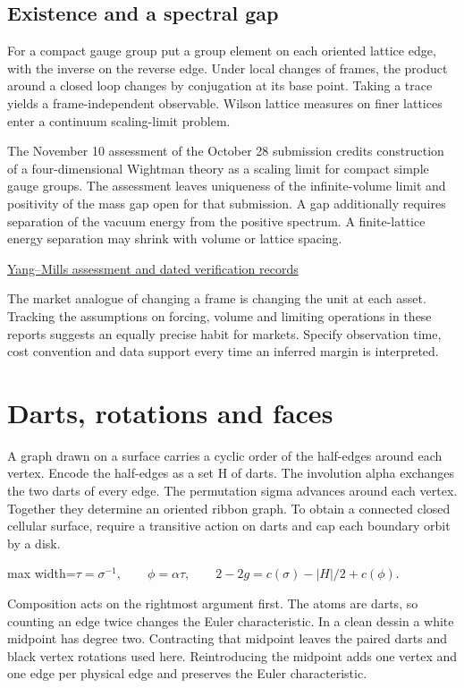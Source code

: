 \documentclass[11pt,oneside,openany]{book}
\begin{document}
\section*{Existence and a spectral gap}
For a compact gauge group put a group element on each oriented lattice edge, with the inverse on the reverse edge. Under local changes of frames, the product around a closed loop changes by conjugation at its base point. Taking a trace yields a frame-independent observable. Wilson lattice measures on finer lattices enter a continuum scaling-limit problem.

The November 10 assessment of the October 28 submission credits construction of a four-dimensional Wightman theory as a scaling limit for compact simple gauge groups. The assessment leaves uniqueness of the infinite-volume limit and positivity of the mass gap open for that submission. A gap additionally requires separation of the vacuum energy from the positive spectrum. A finite-lattice energy separation may shrink with volume or lattice spacing.

{\small\sffamily\href{https://github.com/yang-mills-group/YM}{Yang–Mills assessment and dated verification records}\par}
The market analogue of changing a frame is changing the unit at each asset. Tracking the assumptions on forcing, volume and limiting operations in these reports suggests an equally precise habit for markets. Specify observation time, cost convention and data support every time an inferred margin is interpreted.

\chapter{Darts, rotations and faces}
A graph drawn on a surface carries a cyclic order of the half-edges around each vertex. Encode the half-edges as a set H of darts. The involution alpha exchanges the two darts of every edge. The permutation sigma advances around each vertex. Together they determine an oriented ribbon graph. To obtain a connected closed cellular surface, require a transitive action on darts and cap each boundary orbit by a disk.

\begin{center}\begin{adjustbox}{max width=\linewidth}$\displaystyle \tau=\sigma^{-1},\qquad \phi=\alpha\tau,\qquad 2-2g=c(\sigma)-|H|/2+c(\phi).$\end{adjustbox}\end{center}
Composition acts on the rightmost argument first. The atoms are darts, so counting an edge twice changes the Euler characteristic. In a clean dessin a white midpoint has degree two. Contracting that midpoint leaves the paired darts and black vertex rotations used here. Reintroducing the midpoint adds one vertex and one edge per physical edge and preserves the Euler characteristic.
\end{document}
